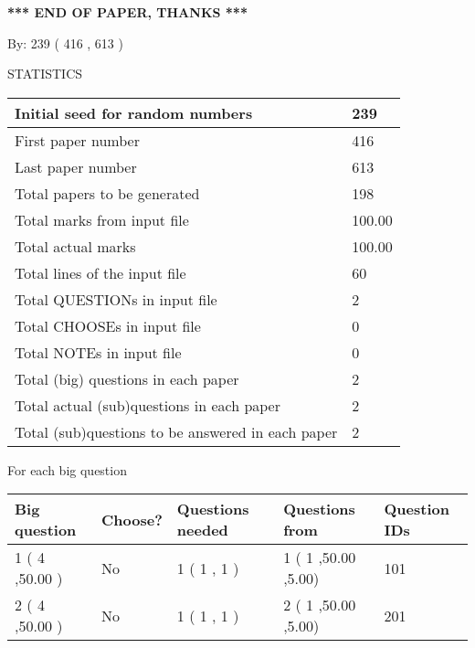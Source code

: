 \documentclass[12pt]{article}
\begin{document}
   
   
\vspace{1.0in} 
{\textbf{\large{ *** END OF PAPER, THANKS *** }}} 
   
   
\hspace{1.0in} By: 
 239 ( 416 ,  613 )
   
   
   
\vspace{0.2in}
\vspace{0.2in}
   
   
 \newpage
\setcounter{page}{1} 
   
   
 {\LARGE{STATISTICS}}
   
\vspace{0.2in}
   
 \begin{tabular}{|l|l|}
 \hline
 Initial seed for random numbers & 239  \\
\hline
 First paper number & 416  \\
\hline
 Last  paper number & 613  \\
\hline
 Total papers to be generated & 198  \\
\hline
Total marks from input file & 100.00 \\
\hline
Total actual marks & 100.00 \\
\hline
 Total lines of the input file & 60  \\
 \hline
 Total QUESTIONs in input file & 2  \\
\hline
 Total CHOOSEs in input file & 0  \\
\hline
 Total NOTEs in input file & 0  \\
\hline
 Total (big) questions in each paper & 2  \\
\hline
 Total actual (sub)questions in each paper & 2  \\
\hline
 Total (sub)questions to be answered in each paper & 2  \\
\hline
 \end{tabular}
   
   
 \newpage
   
{\LARGE{For each big question}}
   
   
\vspace{0.2in}
   
   
\noindent\hspace{-0.4in}\begin{tabular}{|l|l|l|l|l|}
\hline
 Big question & Choose? & Questions needed & Questions from & Question IDs \\ 
\hline
 1 ( 4 ,50.00
 ) &  No   & 
 1 ( 1 ,  1 ) &  1 ( 1
,50.00
 ,5.00) &  101  \\
 \hline
 2 ( 4 ,50.00
 ) &  No   & 
 1 ( 1 ,  1 ) &  2 ( 1
,50.00
 ,5.00) &  201  \\
 \hline
 \end{tabular}
 
 
\end{document}
